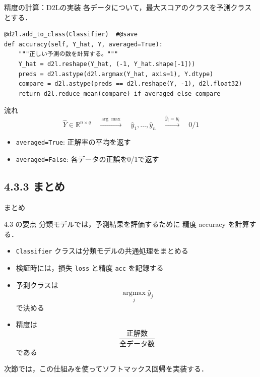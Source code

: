 \documentclass[dvipdfmx,uplatex,11pt]{beamer}
\newcommand{\code}[1]{\texttt{#1}}
\begin{document}
\begin{frame}[fragile]{精度の計算：D2Lの実装}
各データについて，最大スコアのクラスを予測クラスとする．

\begin{lstlisting}
@d2l.add_to_class(Classifier)  #@save
def accuracy(self, Y_hat, Y, averaged=True):
    """正しい予測の数を計算する。"""
    Y_hat = d2l.reshape(Y_hat, (-1, Y_hat.shape[-1]))
    preds = d2l.astype(d2l.argmax(Y_hat, axis=1), Y.dtype)
    compare = d2l.astype(preds == d2l.reshape(Y, -1), d2l.float32)
    return d2l.reduce_mean(compare) if averaged else compare
\end{lstlisting}

\begin{d2lbox}{流れ}
\[
\hat{Y} \in \mathbb{R}^{n\times q}
\quad\xrightarrow{\arg\max}\quad
\hat{y}_1,\ldots,\hat{y}_n
\quad\xrightarrow{\hat{y}_i=y_i}\quad
0/1
\]
\end{d2lbox}

\begin{itemize}
  \item \code{averaged=True}: 正解率の平均を返す
  \item \code{averaged=False}: 各データの正誤を0/1で返す
\end{itemize}
\end{frame}

\subsection{4.3.3 まとめ}
\begin{frame}{まとめ}
\begin{d2lbox}{4.3 の要点}
分類モデルでは，予測結果を評価するために
\alert{精度 accuracy} を計算する．
\end{d2lbox}
\begin{itemize}
  \item \texttt{Classifier} クラスは分類モデルの共通処理をまとめる
  \item 検証時には，損失 \texttt{loss} と精度 \texttt{acc} を記録する
  \item 予測クラスは
  \[
  \operatorname*{argmax}_{j}\hat y_j
  \]
  で決める
  \item 精度は
  \[
  \frac{\text{正解数}}{\text{全データ数}}
  \]
  である
\end{itemize}
次節では，この仕組みを使ってソフトマックス回帰を実装する．
\end{frame}
\end{document}
